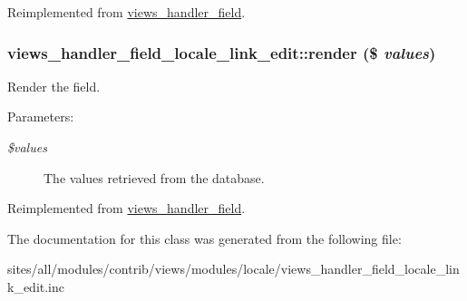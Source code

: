 Reimplemented from \hyperlink{classviews__handler__field_4f661f91bcbe80d4a00c30a31456c502}{views\_\-handler\_\-field}.\hypertarget{classviews__handler__field__locale__link__edit_ea9a4b5bf4281c17e787bae9fee408bd}{
\subsubsection[{render}]{\setlength{\rightskip}{0pt plus 5cm}views\_\-handler\_\-field\_\-locale\_\-link\_\-edit::render (\$ {\em values})}}
\label{classviews__handler__field__locale__link__edit_ea9a4b5bf4281c17e787bae9fee408bd}


Render the field.

\begin{Desc}
\item[Parameters:]
\begin{description}
\item[{\em \$values}]The values retrieved from the database. \end{description}
\end{Desc}


Reimplemented from \hyperlink{classviews__handler__field_82ff951c5e9ceb97b2eab86f880cbc1e}{views\_\-handler\_\-field}.

The documentation for this class was generated from the following file:\begin{CompactItemize}
\item 
sites/all/modules/contrib/views/modules/locale/views\_\-handler\_\-field\_\-locale\_\-link\_\-edit.inc\end{CompactItemize}
